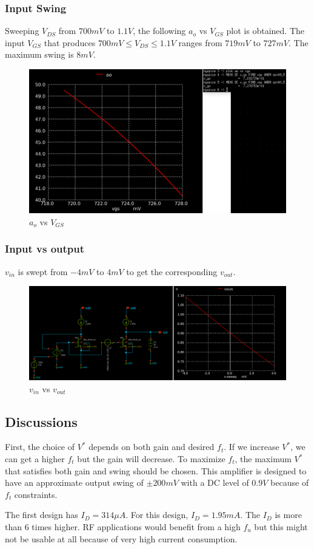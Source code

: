 \documentclass[conference]{IEEEtran}
\begin{document}
\subsubsection{Input Swing}
Sweeping $V_{DS}$ from $700mV$ to $1.1V$, the following $a_o$ vs $V_{GS}$ plot is obtained. 
The input $V_{GS}$ that produces $700mV \leq V_{DS} \leq 1.1V$ ranges from $719mV$ to $727mV$. 
The maximum swing is $8mV$. 
\begin{figure}[H]
	\centering 
	\includegraphics[width=\columnwidth]{gain-fumax-vgs.png}
	\caption{$a_o$ vs $V_{GS}$}
	\label{ao-fumax-vgs}	
\end{figure}
\subsubsection{Input vs output}
$v_{in}$ is swept from $-4mV$ to $4mV$ to get the corresponding $v_{out}$. 
\begin{figure}[H]
	\centering 
	\includegraphics[width=\columnwidth]{vinvout.png}
	\caption{$v_{in}$ vs $v_{out}$}
	\label{vinvout-2}	
\end{figure}

\subsection{Discussions}
First, the choice of $V^*$ depends on both gain and desired $f_t$. If we increase $V^*$, we 
can get a higher $f_t$ but the gain will decrease. To maximize $f_t$, the maximum $V^*$ that 
satisfies both gain and swing should be chosen. This amplifier is designed to have an approximate output swing of $\pm 200mV$ with a DC level of $0.9V$ because of $f_t$ constraints. 

\vspace{8pt}
The first design has $I_D = 314\mu A$. For this design, $I_D=1.95mA$. The $I_D$ is more than 6 times higher. RF applications would benefit from a high $f_u$ but this might not be usable at all because of very high current consumption. 
\end{document}
